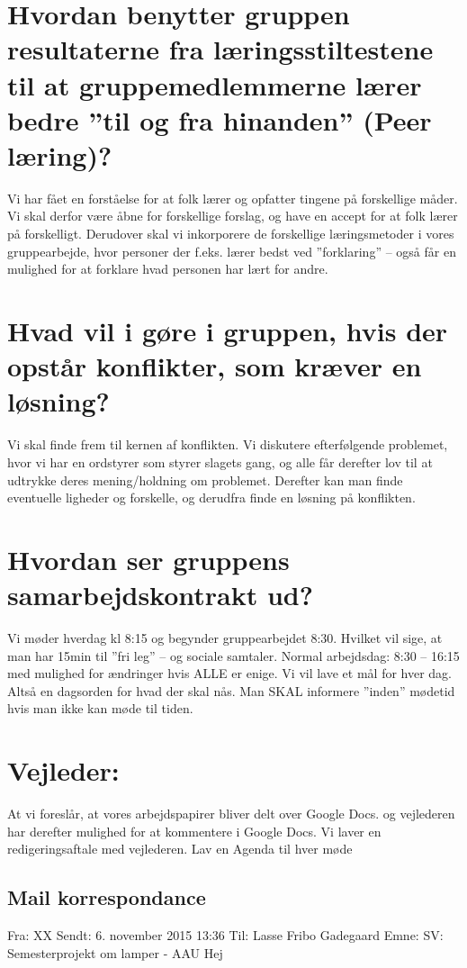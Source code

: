 \documentclass[oneside,a4paper,titlepage]{article}
\begin{document}
\begin{itemize}
\section*{Hvordan benytter gruppen resultaterne fra læringsstiltestene til at gruppemedlemmerne lærer bedre ”til og fra hinanden” (Peer læring)?}
Vi har fået en forståelse for at folk lærer og opfatter tingene på forskellige måder. Vi skal derfor være åbne for forskellige forslag, og have en accept for at folk lærer på forskelligt. Derudover skal vi inkorporere de forskellige læringsmetoder i vores gruppearbejde, hvor personer der f.eks. lærer bedst ved ”forklaring” – også får en mulighed for at forklare hvad personen har lært for andre.
\section*{Hvad vil i gøre i gruppen, hvis der opstår konflikter, som kræver en løsning?}
Vi skal finde frem til kernen af konflikten. Vi diskutere efterfølgende problemet, hvor vi har en ordstyrer som styrer slagets gang, og alle får derefter lov til at udtrykke deres mening/holdning om problemet. Derefter kan man finde eventuelle ligheder og forskelle, og derudfra finde en løsning på konflikten.
\section*{Hvordan ser gruppens samarbejdskontrakt ud?}
Vi møder hverdag kl 8:15 og begynder gruppearbejdet 8:30. Hvilket vil sige, at man har 15min til ”fri leg” – og sociale samtaler.
Normal arbejdsdag: 8:30 – 16:15 med mulighed for ændringer hvis ALLE er enige.
Vi vil lave et mål for hver dag. Altså en dagsorden for hvad der skal nås.
Man SKAL informere ”inden” mødetid hvis man ikke kan møde til tiden.
\section*{Vejleder:}
At vi foreslår, at vores arbejdspapirer bliver delt over Google Docs. og vejlederen har derefter mulighed for at kommentere i Google Docs. Vi laver en redigeringsaftale med vejlederen.
Lav en Agenda til hver møde
\clearpage
\subsection{Mail korrespondance}
Fra: XX \newline
Sendt: 6. november 2015 13:36 \newline
Til: Lasse Fribo Gadegaard\newline
Emne: SV: Semesterprojekt om lamper - AAU\newline
Hej
 

\end{itemize}
\end{document}

